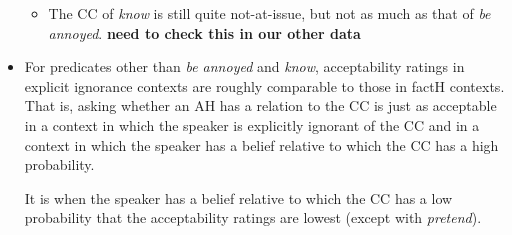 \documentclass[11pt,fleqn]{article}
\newcommand{\6}{\mbox{$[\hspace*{-.6mm}[$}}
\newcommand{\9}{\mbox{$]\hspace*{-.6mm}]$}}
\begin{document}
\begin{itemize}
\begin{itemize}
\item The CC of {\em know} is still quite not-at-issue, but not as much as that of {\em be annoyed}. {\bf need to check this in our other data}

\end{itemize}

\item For predicates other than {\em be annoyed} and {\em know}, acceptability ratings in explicit ignorance contexts are roughly comparable to those in factH contexts. That is, asking whether an AH has a relation to the CC is just as acceptable in a context in which the speaker is explicitly ignorant of the CC and in a context in which the speaker has a belief relative to which the CC has a high probability.

It is when the speaker has a belief relative to which the CC has a low probability that the acceptability ratings are lowest (except with {\em pretend}).


\end{itemize}
\end{document}
